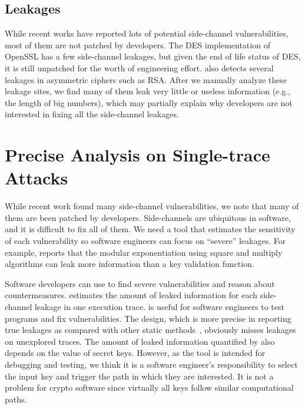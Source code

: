 \subsection*{Leakages} While recent works have reported lots of potential side-channel vulnerabilities, most of them are not patched by developers. The DES implementation of OpenSSL has a few side-channel leakages, but given the end of life status of DES, it is still unpatched for the worth of engineering effort. \detect{} also detects several leakages in asymmetric ciphers such as RSA. After we manually analyze these leakage sites, we find many of them leak very little or useless information (e.g., the length of big numbers), which may partially explain why developers are not interested in fixing all the side-channel leakages. 

\section{Precise Analysis on Single-trace Attacks}
While recent work found many side-channel vulnerabilities,
we note that many of them are been patched by developers.
Side-channels are ubiquitous in software, and it is difficult to fix all of them.
We need a tool that estimates the sensitivity of each vulnerability
so software engineers can focus on
``severe'' leakages. For example, \tool{} reports that
the modular exponentiation using square and multiply algorithms can
leak more information than a key validation function.

Software developers can use \tool{} to find severe vulnerabilities
and reason about countermeasures.
\tool{} estimates the amount of leaked information for each side-channel leakage
in one execution trace. \tool{} is useful for software
engineers to test programs and fix vulnerabilities.
The design, which is more precise in reporting true leakages as compared with other static
methods~\cite{197207,BacelarAlmeida:2013:FVS:2483313.2483334}, obviously misses leakages on unexplored traces. The amount of leaked information quantified by \tool{} also depends on the value of secret keys.
However, as the tool is intended for debugging and testing,
we think it is a software engineer's responsibility to select the input key and trigger
the path in which they are interested. It is not a problem for crypto software 
since virtually all keys follow similar computational paths.

